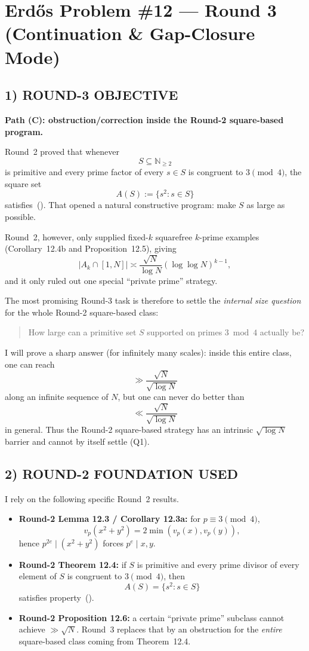 \section{Erd\H{o}s Problem \#12 --- Round 3 (Continuation \& Gap-Closure Mode)}

\subsection*{1) ROUND-3 OBJECTIVE}

\textbf{Path (C): obstruction/correction inside the Round-2 square-based program.}

Round~2 proved that whenever
\[
S\subseteq \mathbb N_{\ge 2}
\]
is primitive and every prime factor of every $s\in S$ is congruent to $3\pmod 4$, the square set
\[
A(S):=\{s^2:s\in S\}
\]
satisfies~(\*). That opened a natural constructive program: make $S$ as large as possible.

Round~2, however, only supplied fixed-$k$ squarefree $k$-prime examples (Corollary~12.4b and Proposition~12.5), giving
\[
|A_k\cap[1,N]|\asymp \frac{\sqrt N}{\log N}(\log\log N)^{k-1},
\]
and it only ruled out one special ``private prime'' strategy.

The most promising Round-3 task is therefore to settle the \emph{internal size question} for the whole Round-2 square-based class:
\begin{quote}
How large can a primitive set $S$ supported on primes $3\bmod 4$ actually be?
\end{quote}
I will prove a sharp answer (for infinitely many scales): inside this entire class, one can reach
\[
\gg \frac{\sqrt N}{\sqrt{\log N}}
\]
along an infinite sequence of $N$, but one can never do better than
\[
\ll \frac{\sqrt N}{\sqrt{\log N}}
\]
in general. Thus the Round-2 square-based strategy has an intrinsic $\sqrt{\log N}$ barrier and cannot by itself settle (Q1).

\subsection*{2) ROUND-2 FOUNDATION USED}

I rely on the following specific Round~2 results.

\begin{itemize}
\item \textbf{Round-2 Lemma 12.3 / Corollary 12.3a:} for $p\equiv 3\pmod 4$,
\[
v_p(x^2+y^2)=2\min(v_p(x),v_p(y)),
\]
hence $p^{2e}\mid (x^2+y^2)$ forces $p^e\mid x,y$.

\item \textbf{Round-2 Theorem 12.4:} if $S$ is primitive and every prime divisor of every element of $S$ is congruent to $3\pmod 4$, then
\[
A(S)=\{s^2:s\in S\}
\]
satisfies property~(\*).

\item \textbf{Round-2 Proposition 12.6:} a certain ``private prime'' subclass cannot achieve $\gg \sqrt N$.
Round~3 replaces that by an obstruction for the \emph{entire} square-based class coming from Theorem~12.4.
\end{itemize}

